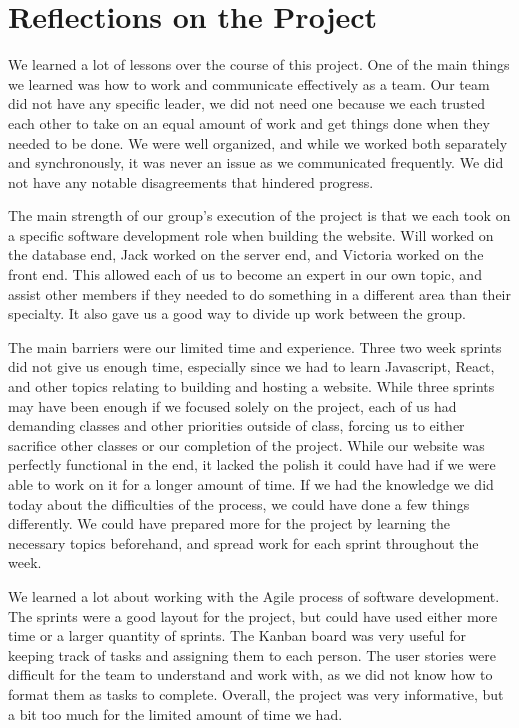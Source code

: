 \section{Reflections on the Project}

We learned a lot of lessons over the course of this project. One of the main things we learned was how to work and communicate effectively as a team. Our team did not have any specific leader, we did not need one because we each trusted each other to take on an equal amount of work and get things done when they needed to be done. We were well organized, and while we worked both separately and synchronously, it was never an issue as we communicated frequently. We did not have any notable disagreements that hindered progress.

The main strength of our group's execution of the project is that we each took on a specific software development role when building the website. Will worked on the database end, Jack worked on the server end, and Victoria worked on the front end. This allowed each of us to become an expert in our own topic, and assist other members if they needed to do something in a different area than their specialty. It also gave us a good way to divide up work between the group. 

The main barriers were our limited time and experience. Three two week sprints did not give us enough time, especially since we had to learn Javascript, React, and other topics relating to building and hosting a website. While three sprints may have been enough if we focused solely on the project, each of us had demanding classes and other priorities outside of class, forcing us to either sacrifice other classes or our completion of the project. While our website was perfectly functional in the end, it lacked the polish it could have had if we were able to work on it for a longer amount of time. If we had the knowledge we did today about the difficulties of the process, we could have done a few things differently. We could have prepared more for the project by learning the necessary topics beforehand, and spread work for each sprint throughout the week.

We learned a lot about working with the Agile process of software development. The sprints were a good layout for the project, but could have used either more time or a larger quantity of sprints. The Kanban board was very useful for keeping track of tasks and assigning them to each person. The user stories were difficult for the team to understand and work with, as we did not know how to format them as tasks to complete. Overall, the project was very informative, but a bit too much for the limited amount of time we had.



